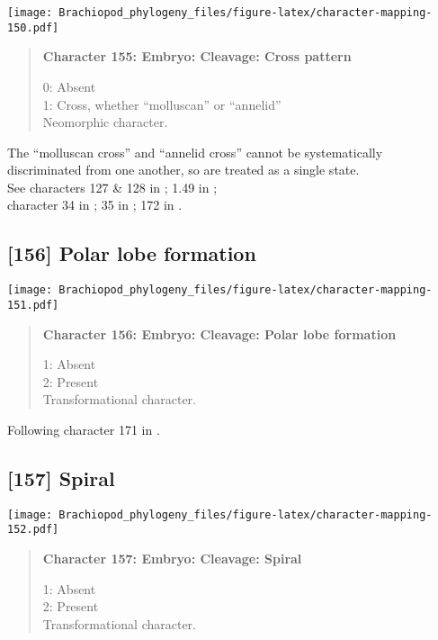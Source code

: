 \documentclass[openany]{book}
\theoremstyle{definition}
\theoremstyle{definition}
\theoremstyle{definition}
\theoremstyle{remark}
\begin{document}
\texttt{[image: Brachiopod\_phylogeny\_files/figure-latex/character-mapping-150.pdf]}

\begin{quote}
\textbf{Character 155: Embryo: Cleavage: Cross pattern}

0: Absent\\
1: Cross, whether ``molluscan'' or ``annelid''\\
Neomorphic character.
\end{quote}

The ``molluscan cross'' and ``annelid cross'' cannot be systematically
discriminated from one another, so are treated as a single state.\\
See characters 127 \& 128 in \citet{Rouse1999}; 1.49 in
\citet{SPS1996};\\
character 34 in \citet{Haszprunar1996}; 35 in \citet{Haszprunar2000};
172 in \citet{Giribet2002}.

\subsection*{{[}156{]} Polar lobe formation}\label{polar-lobe-formation}

\texttt{[image: Brachiopod\_phylogeny\_files/figure-latex/character-mapping-151.pdf]}

\begin{quote}
\textbf{Character 156: Embryo: Cleavage: Polar lobe formation}

1: Absent\\
2: Present\\
Transformational character.
\end{quote}

Following character 171 in \citet{Giribet2002}.

\subsection*{{[}157{]} Spiral}\label{spiral}

\texttt{[image: Brachiopod\_phylogeny\_files/figure-latex/character-mapping-152.pdf]}

\begin{quote}
\textbf{Character 157: Embryo: Cleavage: Spiral}

1: Absent\\
2: Present\\
Transformational character.
\end{quote}
\end{document}
